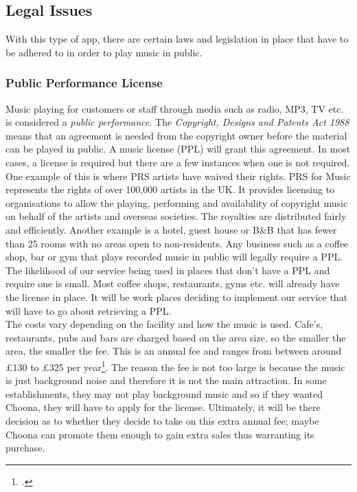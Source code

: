 \subsection{\textbf{Legal Issues}}
With this type of app, there are certain laws and legislation in place that have to be adhered to in order to play music in public.  
\subsubsection{Public Performance License}
    Music playing for customers or staff through media such as radio, MP3, TV etc. is considered a \emph{public performance}. The \emph{Copyright, Designs and Patents Act 1988} means that an agreement is needed from the copyright owner before the material can be played in public. A music license (PPL) will grant this agreement. In most cases, a license is required but there are a few instances when one is not required. One example of this is where PRS  artists have waived their rights. PRS for Music represents the rights of over 100,000 artists in the UK.  It provides licensing to organisations to allow the playing, performing and availability of copyright music on behalf of the artists and overseas societies.  The royalties are distributed fairly and efficiently.  Another example is a hotel, guest house or B\&B that has fewer than 25 rooms with no areas open to non-residents. 
    Any business such as a coffee shop, bar or gym that plays recorded music in public will legally require a PPL. The likelihood of our service being used in places that don't have a PPL and require one is small.  Most coffee shops, restaurants, gyms etc. will already have the license in place.  It will be work places deciding to implement our service that will have to go about retrieving a PPL.\\
The costs vary depending on the facility and how the music is used.  Cafe's, restaurants, pubs and bars are charged based on the area size, so the smaller the area, the smaller the fee.  This is an annual fee and ranges from between around £130 to £325 per year\footcite{ppl}.  The reason the fee is not too large is because the music is just background noise and therefore it is not the main attraction.  In some establishments, they may not play background music and so if they wanted Choona, they will have to apply for the license.  Ultimately, it will be there decision as to whether they decide to take on this extra annual fee; maybe Choona can promote them enough to gain extra sales thus warranting its purchase.    \\
